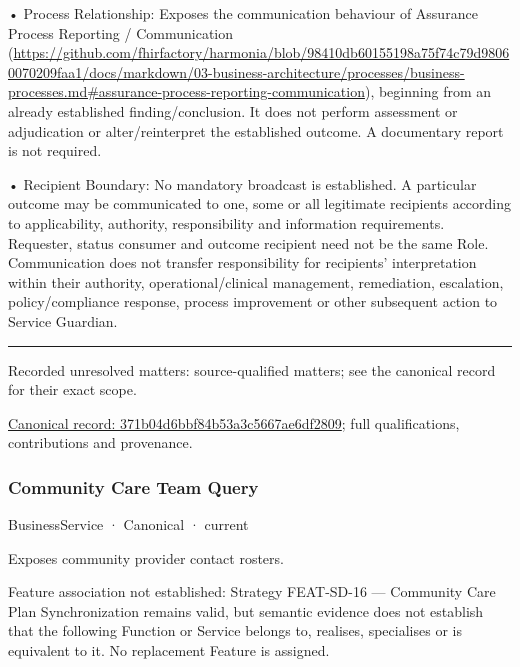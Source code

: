 •
Process Relationship: Exposes the communication behaviour of Assurance Process Reporting / Communication (\url{https://github.com/fhirfactory/harmonia/blob/98410db60155198a75f74c79d98060070209faa1/docs/markdown/03-business-architecture/processes/business-processes.md#assurance-process-reporting-communication}), beginning from an already established finding/conclusion. It does not perform assessment or adjudication or alter/reinterpret the established outcome. A documentary report is not required.



•
Recipient Boundary: No mandatory broadcast is established. A particular outcome may be communicated to one, some or all legitimate recipients according to applicability, authority, responsibility and information requirements. Requester, status consumer and outcome recipient need not be the same Role. Communication does not transfer responsibility for recipients' interpretation within their authority, operational/clinical management, remediation, escalation, policy/compliance response, process improvement or other subsequent action to Service Guardian.



\medskip\hrule\medskip

{\small Recorded unresolved matters: source-qualified matters; see the canonical record for their exact scope.}\par
{\footnotesize \href{../../../../continuum/business/business-service/371b04d6bbf84b53a3c5667ae6df2809.md}{Canonical record: 371b04d6bbf84b53a3c5667ae6df2809}; full qualifications, contributions and provenance.}\par
\subsubsection{Community Care Team Query}

\label{element:5292120098cc4b7e8280b22f46b60b95}
{\small BusinessService · Canonical · current}\par

Exposes community provider contact rosters.



Feature association not established: Strategy FEAT-SD-16 — Community Care Plan Synchronization remains valid, but semantic evidence does not establish that the following Function or Service belongs to, realises, specialises or is equivalent to it. No replacement Feature is assigned.


